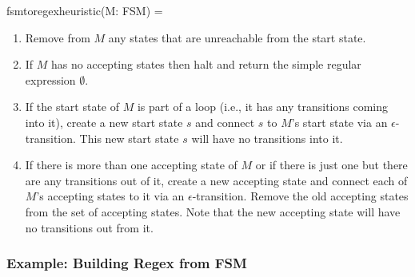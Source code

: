 \documentclass[hidelinks,12pt]{article}
\begin{document}
fsmtoregexheuristic(M: FSM) =
\begin{enumerate}
  \item Remove from $M$ any states that are unreachable from the start state.

  \item If $M$ has no accepting states then halt and return the simple
  regular expression $\emptyset$.
  
  \item If the start state of $M$ is part of a loop (i.e., it has any
  transitions coming into it), create a new start state $s$
  and connect $s$ to $M$’s start state via an
  $\epsilon$-transition. This new start state $s$ will have
  no transitions into it.
  
  \item If there is more than one accepting state of $M$ or if there is
		  just one but there are any transitions out of it,
		  create a new accepting state and connect each
		  of $M$’s accepting states to it via an
		  $\epsilon$-transition. Remove the old accepting states
		  from the set of accepting states. Note that the
		  new accepting state will have no transitions
		  out from it.
\end{enumerate}

\subsubsection{Example: Building Regex from FSM}
\end{document}
